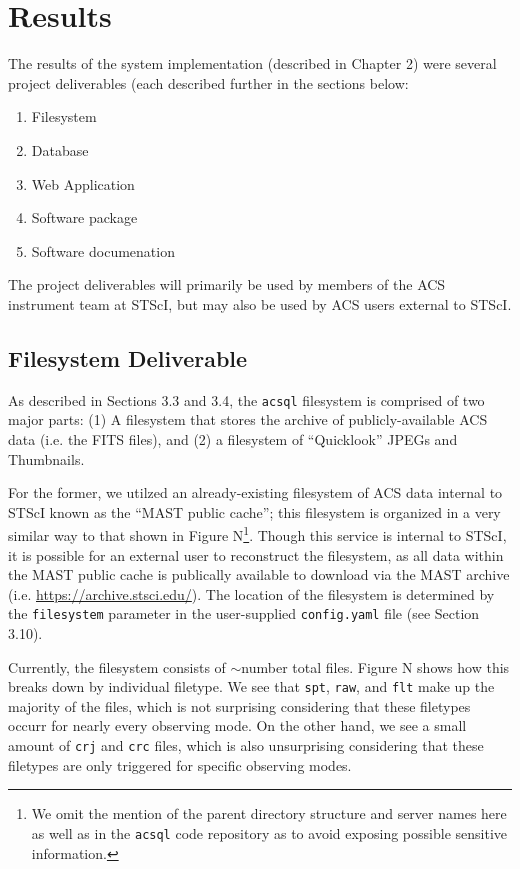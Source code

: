 \documentclass[10pt,journal,compsoc]{IEEEtran}
\begin{document}
\section{Results}\label{sec:results}

The results of the system implementation (described in Chapter 2) were several project deliverables (each described further in the
sections below:

\begin{enumerate}
\item Filesystem
\item Database
\item Web Application
\item Software package
\item Software documenation
\end{enumerate}


The project deliverables will primarily be used by members of the ACS instrument team at STScI, but may also be used
by ACS users external to STScI.


\subsection{Filesystem Deliverable}

As described in Sections 3.3 and 3.4, the \texttt{acsql} filesystem is comprised of two major parts: (1) A filesystem
that stores the archive of publicly-available ACS data (i.e. the FITS files), and (2) a filesystem of ``Quicklook''
JPEGs and Thumbnails.

For the former, we utilzed an already-existing filesystem of ACS data internal to STScI known as the ``MAST public cache'';
this filesystem is organized in a very similar way to that shown in Figure N\footnote{We omit the mention of the parent
directory structure and server names here as well as in the \texttt{acsql} code repository as to avoid exposing possible
sensitive information.}.  Though this service is internal to STScI, it is possible for an external user to reconstruct the
filesystem, as all data within the MAST public cache is publically available to download via the MAST archive (i.e.
\url{https://archive.stsci.edu/}).  The location of the filesystem is determined by the \texttt{filesystem} parameter in
the user-supplied \texttt{config.yaml} file (see Section 3.10).

Currently, the filesystem consists of $\sim$number total files. Figure N shows how this breaks down by individual
filetype.  We see that \texttt{spt}, \texttt{raw}, and \texttt{flt} make up the majority of the files, which is not surprising
considering that these filetypes occurr for nearly every observing mode.  On the other hand, we see a small amount of
\texttt{crj} and \texttt{crc} files, which is also unsurprising considering that these filetypes are only triggered for
specific observing modes.
\end{document}

